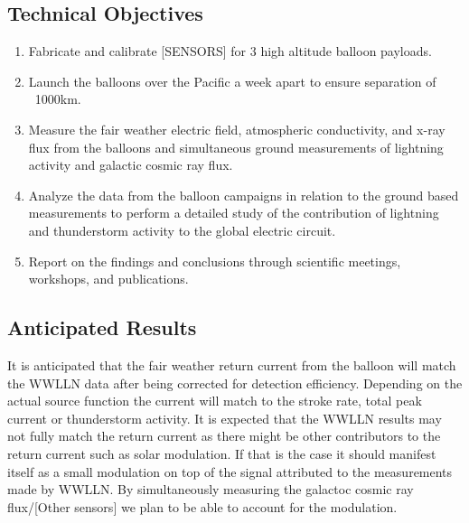 \subsection*{Technical Objectives}

\begin{enumerate}
\item{Fabricate and calibrate [SENSORS] for 3 high altitude balloon payloads.}
\item{Launch the balloons over the Pacific a week apart to ensure separation of ~1000km.}
\item{Measure the fair weather electric field, atmospheric conductivity, and x-ray flux from the balloons and simultaneous ground measurements of lightning activity and galactic cosmic ray flux.}
\item{Analyze the data from the balloon campaigns in relation to the ground based measurements to perform a detailed study of the contribution of lightning and thunderstorm activity to the global electric circuit.}
\item{Report on the findings and conclusions through scientific meetings, workshops, and publications.}
\end{enumerate}

\subsection*{Anticipated Results}

It is anticipated that the fair weather return current from the balloon will match the WWLLN data after being corrected for detection efficiency.
Depending on the actual source function the current will match to the stroke rate, total peak current or thunderstorm activity.
It is expected that the WWLLN results may not fully match the return current as there might be other contributors to the return current such as solar modulation.
If that is the case it should manifest itself as a small modulation on top of the signal attributed to the measurements made by WWLLN.
By simultaneously measuring the galactoc cosmic ray flux/[Other sensors] we plan to be able to account for the modulation.
